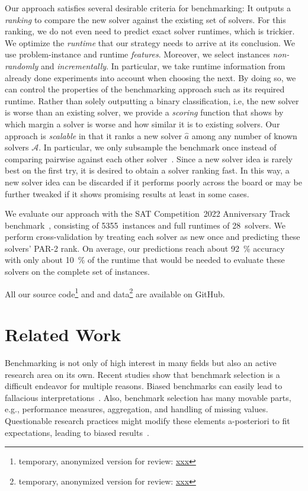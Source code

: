 \documentclass[runningheads]{llncs}
\begin{document}
Our approach satisfies several desirable criteria for benchmarking:
It outputs a \emph{ranking} to compare the new solver against the existing set of solvers.
For this ranking, we do not even need to predict exact solver runtimes, which is trickier.
We optimize the \emph{runtime} that our strategy needs to arrive at its conclusion.
We use problem-instance and runtime \emph{features}.
Moreover, we select instances \emph{non-randomly} and \emph{incrementally}.
In particular, we take runtime information from already done experiments into account when choosing the next.
By doing so, we can control the properties of the benchmarking approach such as its required runtime.
Rather than solely outputting a binary classification, i.e, the new solver is worse than an existing solver, we provide a \emph{scoring} function that shows by which margin a solver is worse and how similar it is to existing solvers.
Our approach is \emph{scalable} in that it ranks a new solver $\hat{a}$ among any number of known solvers $\mathcal{A}$.
In particular, we only subsample the benchmark once instead of comparing pairwise against each other solver~\cite{MatriconAFSH21}.
Since a new solver idea is rarely best on the first try, it is desired to obtain a solver ranking fast.
In this way, a new solver idea can be discarded if it performs poorly across the board or may be further tweaked if it shows promising results at least in some cases.

We evaluate our approach with the SAT Competition~2022 Anniversary Track benchmark~\cite{sat2022}, consisting of 5355~instances and full runtimes of 28~solvers.
We perform cross-validation by treating each solver as new once and predicting these solvers' PAR-2 rank.
On average, our predictions reach about \SI{92}{\%} accuracy with only about \SI{10}{\%} of the runtime that would be needed to evaluate these solvers on the complete set of instances.

All our source code\footnote{temporary, anonymized version for review: \url{xxx}} and and data\footnote{temporary, anonymized version for review: \url{xxx}} are available on GitHub.


\section{Related Work}

Benchmarking is not only of high interest in many fields but also an active research area on its own.
Recent studies show that benchmark selection is a difficult endeavor for multiple reasons.
Biased benchmarks can easily lead to fallacious interpretations~\cite{abs-2107-07002}.
Also, benchmark selection has many movable parts, e.g., performance measures, aggregation, and handling of missing values.
Questionable research practices might modify these elements a-posteriori to fit expectations, leading to biased results~\cite{NiesslHWCB22}.
\end{document}
